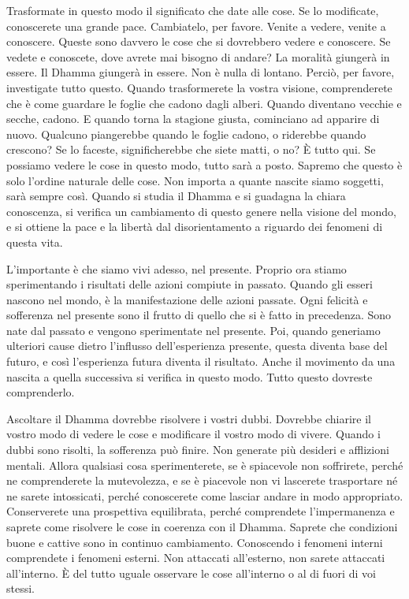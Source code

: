 Trasformate in questo modo il significato che date alle cose. Se lo
modificate, conoscerete una grande pace. Cambiatelo, per favore. Venite
a vedere, venite a conoscere. Queste sono davvero le cose che si
dovrebbero vedere e conoscere. Se vedete e conoscete, dove avrete mai
bisogno di andare? La moralità giungerà in essere. Il Dhamma giungerà in
essere. Non è nulla di lontano. Perciò, per favore, investigate tutto
questo. Quando trasformerete la vostra visione, comprenderete che è come
guardare le foglie che cadono dagli alberi. Quando diventano vecchie e
secche, cadono. E quando torna la stagione giusta, cominciano ad
apparire di nuovo. Qualcuno piangerebbe quando le foglie cadono, o
riderebbe quando crescono? Se lo faceste, significherebbe che siete
matti, o no? È tutto qui. Se possiamo vedere le cose in questo modo,
tutto sarà a posto. Sapremo che questo è solo l'ordine naturale delle
cose. Non importa a quante nascite siamo soggetti, sarà sempre così.
Quando si studia il Dhamma e si guadagna la chiara conoscenza, si
verifica un cambiamento di questo genere nella visione del mondo, e si
ottiene la pace e la libertà dal disorientamento a riguardo dei fenomeni
di questa vita.

L'importante è che siamo vivi adesso, nel presente. Proprio ora stiamo
sperimentando i risultati delle azioni compiute in passato. Quando gli
esseri nascono nel mondo, è la manifestazione delle azioni passate. Ogni
felicità e sofferenza nel presente sono il frutto di quello che si è
fatto in precedenza. Sono nate dal passato e vengono sperimentate nel
presente. Poi, quando generiamo ulteriori cause dietro l'influsso
dell'esperienza presente, questa diventa base del futuro, e così
l'esperienza futura diventa il risultato. Anche il movimento da una
nascita a quella successiva si verifica in questo modo. Tutto questo
dovreste comprenderlo.

Ascoltare il Dhamma dovrebbe risolvere i vostri dubbi. Dovrebbe chiarire
il vostro modo di vedere le cose e modificare il vostro modo di vivere.
Quando i dubbi sono risolti, la sofferenza può finire. Non generate più
desideri e afflizioni mentali. Allora qualsiasi cosa sperimenterete, se
è spiacevole non soffrirete, perché ne comprenderete la mutevolezza, e
se è piacevole non vi lascerete trasportare né ne sarete intossicati,
perché conoscerete come lasciar andare in modo appropriato. Conserverete
una prospettiva equilibrata, perché comprendete l'impermanenza e saprete
come risolvere le cose in coerenza con il Dhamma. Saprete che condizioni
buone e cattive sono in continuo cambiamento. Conoscendo i fenomeni
interni comprendete i fenomeni esterni. Non attaccati all'esterno, non
sarete attaccati all'interno. È del tutto uguale osservare le cose
all'interno o al di fuori di voi stessi.

